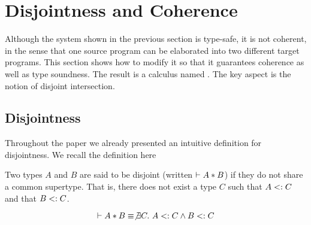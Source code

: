 \section{Disjointness and Coherence}
\label{sec:disjoint}
Although the system shown in the previous section is type-safe, it is not
coherent, in the sense that one source program can be elaborated into two
different target programs. This section shows how to modify it so that it
guarantees coherence as well as type soundness. The result is a calculus named
\name. The key aspect is the notion of disjoint intersection.

%
%
%

\subsection{Disjointness} Throughout the paper we already presented an intuitive
definition for disjointness. We recall the definition here


\begin{definition}

  Two types $A$ and $B$ are said to be disjoint
  (written $\vdash A * B$) if they do not share a common supertype. That is,
  there does not exist a type $C$ such that $A <: C$ and that $B <:
  C$.

  \[\vdash A * B \equiv \not \exists C.~A <: C \wedge B <: C\]

\end{definition}

